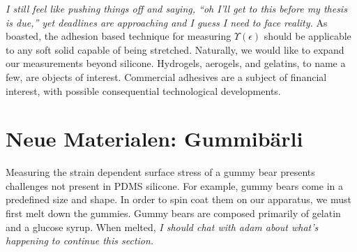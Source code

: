 \emph{I still feel like pushing things off and saying, ``oh I'll get to this before my thesis is due,'' yet deadlines are approaching and I guess I need to face reality.} As boasted, the adhesion based technique for measuring $\Upsilon(\epsilon)$ should be applicable to any soft solid capable of being stretched. Naturally, we would like to expand our measurements beyond silicone. Hydrogels, aerogels, and gelatins, to name a few, are objects of interest. Commercial adhesives are a subject of financial interest, with possible consequential technological developments.

\section{Neue Materialen: Gummibärli}
Measuring the strain dependent surface stress of a gummy bear presents challenges not present in PDMS silicone. For example, gummy bears come in a predefined size and shape. In order to spin coat them on our apparatus, we must first melt down the gummies. Gummy bears are composed primarily of gelatin and a glucose syrup. When melted, \emph{I should chat with adam about what's happening to continue this section.} 